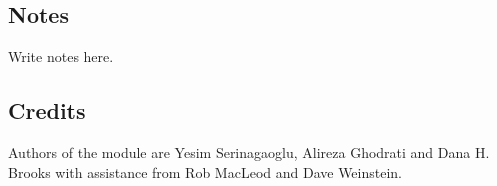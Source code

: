 
\subsection{Notes}

Write notes here.


\subsection{Credits}

Authors of the  module are Yesim Serinagaoglu, Alireza
Ghodrati and Dana H. Brooks with assistance from Rob MacLeod and Dave
Weinstein.

